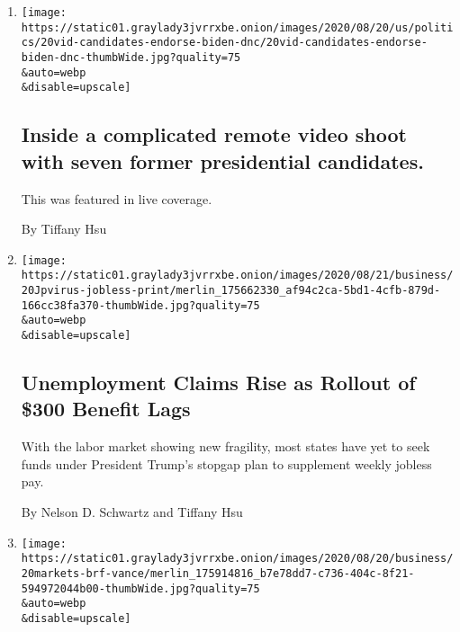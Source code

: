 \begin{enumerate}
\def\labelenumi{\arabic{enumi}.}
\item
  \href{/live/2020/08/20/us/dnc-convention-election/inside-a-complicated-remote-video-shoot-with-seven-former-presidential-candidates}{}

  \texttt{[image: https://static01.graylady3jvrrxbe.onion/images/2020/08/20/us/politics/20vid-candidates-endorse-biden-dnc/20vid-candidates-endorse-biden-dnc-thumbWide.jpg?quality=75\\\&auto=webp\\\&disable=upscale]}

  \hypertarget{inside-a-complicated-remote-video-shoot-with-seven-former-presidential-candidates}{%
  \subsection{Inside a complicated remote video shoot with seven former
  presidential
  candidates.}\label{inside-a-complicated-remote-video-shoot-with-seven-former-presidential-candidates}}

  This was featured in live coverage.

  By Tiffany Hsu
\item
  \href{/2020/08/20/business/economy/unemployment-claims.html}{}

  \texttt{[image: https://static01.graylady3jvrrxbe.onion/images/2020/08/21/business/20Jpvirus-jobless-print/merlin\_175662330\_af94c2ca-5bd1-4cfb-879d-166cc38fa370-thumbWide.jpg?quality=75\\\&auto=webp\\\&disable=upscale]}

  \hypertarget{unemployment-claims-rise-as-rollout-of-300-benefit-lags}{%
  \subsection{Unemployment Claims Rise as Rollout of \$300 Benefit
  Lags}\label{unemployment-claims-rise-as-rollout-of-300-benefit-lags}}

  With the labor market showing new fragility, most states have yet to
  seek funds under President Trump's stopgap plan to supplement weekly
  jobless pay.

  By Nelson D. Schwartz and Tiffany Hsu
\item
  \href{/live/2020/08/20/business/stock-market-today-coronavirus/finding-a-job-after-a-long-search-but-settling-for-less-pay}{}

  \texttt{[image: https://static01.graylady3jvrrxbe.onion/images/2020/08/20/business/20markets-brf-vance/merlin\_175914816\_b7e78dd7-c736-404c-8f21-594972044b00-thumbWide.jpg?quality=75\\\&auto=webp\\\&disable=upscale]}


\end{enumerate}
